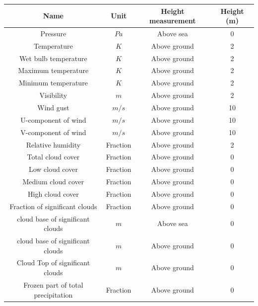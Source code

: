 \begin{table}[h]
	\centering
	\begin{tabular}{|c|c|c|c|}
		\hline
		\textbf{Name} & \textbf{Unit} & \textbf{Height measurement} & \textbf{Height (m)} \\
		\hline \hline
		Pressure                           & $Pa$        & Above sea         & 0 \\
		\hline
		Temperature                        & $K$         & Above ground      & 2 \\
		\hline
		Wet bulb temperature               & $K$         & Above ground      & 2 \\
		\hline
		Maximum temperature                & $K$         & Above ground      & 2 \\
		\hline
		Minimum temperature                & $K$         & Above ground      & 2 \\
		\hline
		Visibility                         & $m$         & Above ground      & 2 \\
		\hline
		Wind gust                          & $m/s$       & Above ground      & 10 \\
		\hline
		U-component of wind                & $m/s$       & Above ground      & 10 \\
		\hline
		V-component of wind                & $m/s$       & Above ground      & 10 \\
		\hline
		Relative humidity                  & Fraction    & Above ground      & 2 \\
		\hline
		Total cloud cover                  & Fraction    & Above ground      & 0 \\
		\hline
		Low cloud cover                    & Fraction    & Above ground      & 0 \\
		\hline
		Medium cloud cover                 & Fraction    & Above ground      & 0 \\
		\hline
		High cloud cover                   & Fraction    & Above ground      & 0 \\
		\hline
		Fraction of significant clouds     & Fraction    & Above ground      & 0 \\
		\hline
		cloud base of significant clouds   & $m$         & Above sea         & 0 \\
		\hline
		cloud base of significant clouds   & $m$         & Above ground      & 0 \\
		\hline
		Cloud Top of significant clouds    & $m$         & Above ground      & 0 \\
		\hline
		Frozen part of total precipitation & Fraction    & Above ground      & 0 \\

\end{tabular}
\end{table}
